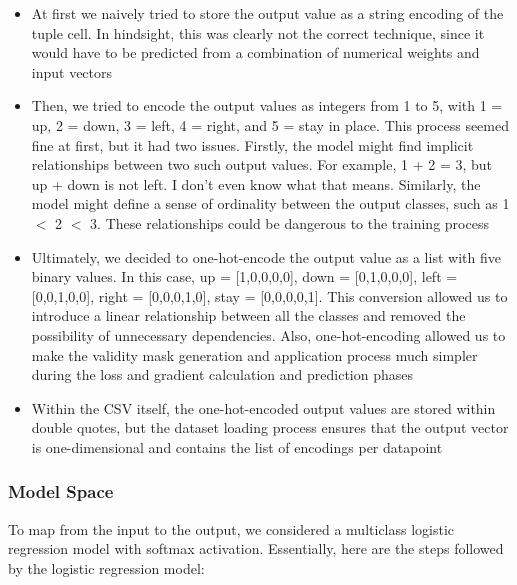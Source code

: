\documentclass[11pt]{article}
\begin{document}
\begin{itemize}
    \item At first we naively tried to store the output value as a string encoding of the tuple cell. In hindsight, this was clearly not the correct technique, since it would have to be predicted from a combination of numerical weights and input vectors
    \item Then, we tried to encode the output values as integers from 1 to 5, with 1 = up, 2 = down, 3 = left, 4 = right, and 5 = stay in place. This process seemed fine at first, but it had two issues. Firstly, the model might find implicit relationships between two such output values. For example, 1 + 2 = 3, but up + down is not left. I don't even know what that means. Similarly, the model might define a sense of ordinality between the output classes, such as 1 $<$ 2 $<$ 3. These relationships could be dangerous to the training process
    \item Ultimately, we decided to one-hot-encode the output value as a list with five binary values. In this case, up = [1,0,0,0,0], down = [0,1,0,0,0], left = [0,0,1,0,0], right = [0,0,0,1,0], stay = [0,0,0,0,1]. This conversion allowed us to introduce a linear relationship between all the classes and removed the possibility of unnecessary dependencies. Also, one-hot-encoding allowed us to make the validity mask generation and application process much simpler during the loss and gradient calculation and prediction phases
    \item Within the CSV itself, the one-hot-encoded output values are stored within double quotes, but the dataset loading process ensures that the output vector is one-dimensional and contains the list of encodings per datapoint
\end{itemize}

\subsubsection{Model Space}

To map from the input to the output, we considered a multiclass logistic regression model with softmax activation. Essentially, here are the steps followed by the logistic regression model:
\end{document}
